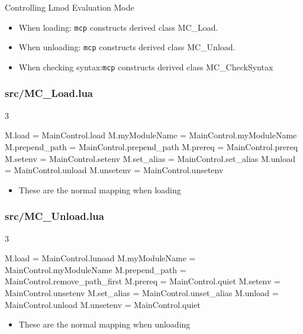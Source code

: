\documentclass{beamer}
\begin{document}
\begin{frame}{Controlling Lmod Evaluation Mode}
  \begin{itemize}
    \item When loading: \texttt{mcp} constructs derived class
      MC\_Load.
    \item When unloading: \texttt{mcp} constructs derived class
      MC\_Unload.
    \item When checking syntax:\texttt{mcp} constructs derived class
      MC\_CheckSyntax
  \end{itemize}
\end{frame}



\begin{frame}[fragile]
    \frametitle{src/MC\_Load.lua}3
 {\tiny
    \begin{semiverbatim}
M.load                 = MainControl.load
M.myModuleName         = MainControl.myModuleName
M.prepend\_path         = MainControl.prepend\_path
M.prereq               = MainControl.prereq
M.setenv               = MainControl.setenv
M.set\_alias            = MainControl.set\_alias
M.unload               = MainControl.unload
M.unsetenv             = MainControl.unsetenv
    \end{semiverbatim}
}
  \begin{itemize}
    \item These are the normal mapping when loading
  \end{itemize}

\end{frame}

\begin{frame}[fragile]
    \frametitle{src/MC\_Unload.lua}3
 {\tiny
    \begin{semiverbatim}
M.load                 = MainControl.lunoad
M.myModuleName         = MainControl.myModuleName
M.prepend\_path         = MainControl.remove\_path\_first
M.prereq               = MainControl.quiet
M.setenv               = MainControl.unsetenv
M.set\_alias            = MainControl.unset\_alias
M.unload               = MainControl.unload
M.unsetenv             = MainControl.quiet
    \end{semiverbatim}
}
  \begin{itemize}
    \item These are the normal mapping when unloading
  \end{itemize}
\end{frame}
\end{document}
